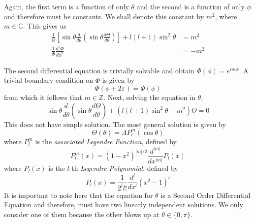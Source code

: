 Again, the first term is a function of only $\theta$ and the second is a function of only $\phi$ and therefore must be constants. We shall denote this constant by $m^2$, where $m\in\mathbb{C}$. This gives us 
\begin{align*}
    \frac{1}{\Theta}\left[\sin\theta\frac{d}{d\theta}\left(\sin\theta\frac{d\Theta}{d\theta}\right)\right] + l(l + 1)\sin^2\theta &= m^2\\
    \frac{1}{\Phi}\frac{d^2\Phi}{d\phi^2} &= -m^2
\end{align*}

The second differential equation is trivially solvable and obtain $\Phi(\phi) = e^{im\phi}$. A trivial boundary condition on $\Phi$ is given by 
\begin{equation*}
    \Phi(\phi + 2\pi) = \Phi(\phi)
\end{equation*}
from which it follows that $m\in\mathbb{Z}$. Next, solving the equation in $\theta$,
\begin{equation*}
    \sin\theta\frac{d}{d\theta}\left(\sin\theta\frac{d\Theta}{d\theta}\right) + (l(l + 1)\sin^2\theta - m^2)\Theta = 0
\end{equation*}
This does not have simple solution. The most general solution is given by 
\begin{equation*}
    \Theta(\theta) = AP_l^m(\cos\theta)
\end{equation*}
where $P_l^m$ is the \textit{associated Legendre Function}, defined by 
\begin{equation*}
    P_l^m(x) = (1-x^2)^{|m|/2}\frac{d^{|m|}}{dx^{|m|}}P_l(x)
\end{equation*}
where $P_l(x)$ is the $l$-th \textit{Legendre Polynomial}, defined by 
\begin{equation*}
    P_l(x) = \frac{1}{2^ll!}\frac{d^l}{dx^l}(x^2-1)^l
\end{equation*}
It is important to note here that the equation for $\theta$ is a Second Order Differential Equation and therefore, must have two linearly independent solutions. We only consider one of them because the other blows up at $\theta\in\{0,\pi\}$.


